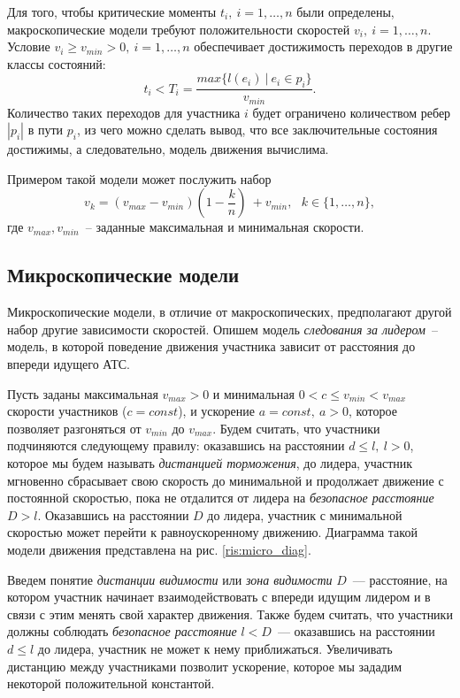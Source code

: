 \documentclass[12pt, a4paper]{article}
\begin{document}
	Для того, чтобы критические моменты $t_i, \: i = 1, \dots, n$ были определены, макроскопические модели требуют положительности скоростей $v_i, \: i = 1, \dots, n$. Условие $v_i \ge v_{min} > 0, \: i = 1, \dots, n$ обеспечивает достижимость переходов в другие классы состояний:
	$$t_i < T_i = \frac{max\{l(e_i) \: | \: e_i \in p_i\}}{v_{min}}.$$
	Количество таких переходов для участника $i$ будет ограничено количеством ребер $|p_i|$ в пути $p_i$, из чего можно сделать вывод, что все заключительные состояния достижимы, а следовательно, модель движения вычислима.
	
	Примером такой модели может послужить набор 
	\begin{equation}
		\label{eq:example_macro}
		v_k = (v_{max} - v_{min}) \left(1 - \frac{k}{n}\right)\ + v_{min}, \text{ } k \in \{1, \dots, n\}, 
	\end{equation}
	где $v_{max}, v_{min}$~-- заданные максимальная и минимальная скорости. 
	
	\subsection{Микроскопические модели}
	
	Микроскопические модели, в отличие от макроскопических, предполагают другой набор другие зависимости скоростей.
	Опишем модель \textit{следования за лидером}~-- модель, в которой поведение движения участника зависит от расстояния до впереди идущего АТС. 
	
	Пусть заданы максимальная $v_{max} > 0$ и минимальная $0 < c \le v_{min} < v_{max}$ скорости участников ($c = const$), и ускорение $a = const, \: a > 0$, которое позволяет разгоняться от $v_{min}$ до $v_{max}$. Будем считать, что участники подчиняются следующему правилу:
	оказавшись на расстоянии $d \leq l, \: l > 0$, которое мы будем называть \textit{дистанцией торможения}, до лидера, участник
	мгновенно сбрасывает свою скорость до минимальной и продолжает движение с постоянной скоростью, пока не отдалится от лидера на \textit{безопасное расстояние} $D > l$. Оказавшись на расстоянии $D$ до лидера, участник с минимальной скоростью может перейти к равноускоренному движению. Диаграмма такой модели движения представлена на рис. \ref{ris:micro_diag}.
	
	Введем понятие \textit{дистанции видимости} или \textit{зона видимости} $D$~--- расстояние, на котором участник начинает взаимодействовать с впереди идущим лидером и в связи с этим менять свой характер движения. Также будем считать, что участники должны соблюдать \textit{безопасное расстояние} $l < D$~--- оказавшись на расстоянии $d \leq l$ до лидера, участник не может к нему приближаться. Увеличивать дистанцию между участниками позволит ускорение, которое мы зададим некоторой положительной константой.
	
\end{document}
